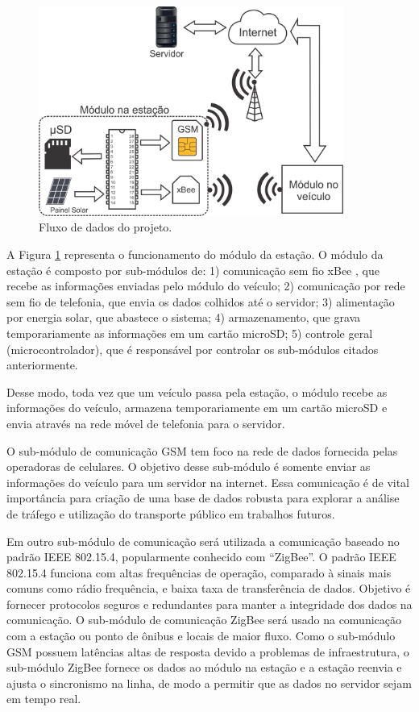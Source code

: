 \documentclass[12pt]{uftpibicsic2020}
\begin{document}
\begin{figure}[!h]
\centering
\includegraphics[width=10cm]{ruti2.png}
\caption{Fluxo de dados do projeto.}
\label{fig:modulo_estacao}
\end{figure}

A Figura \ref{fig:modulo_estacao} representa o funcionamento do módulo da estação. O módulo da estação é composto por sub-módulos de: 1) comunicação sem fio xBee \cite{xbee}, que recebe as informações enviadas pelo módulo do veículo; 2) comunicação por rede sem fio de telefonia, que envia os dados colhidos até o servidor; 3) alimentação por energia solar, que abastece o sistema; 4) armazenamento, que grava temporariamente as informações em um cartão microSD; 5) controle geral (microcontrolador), que é responsável por controlar os sub-módulos citados anteriormente.

Desse modo, toda vez que um veículo passa pela estação, o módulo recebe as informações do veículo, armazena temporariamente em um cartão microSD e envia através na rede móvel de telefonia para o servidor.

O sub-módulo de comunicação GSM tem foco na rede de dados fornecida pelas operadoras de celulares. O objetivo desse sub-módulo é somente enviar as informações do veículo para um servidor na internet. Essa comunicação é de vital importância para criação de uma base de dados robusta para explorar a análise de tráfego e utilização do transporte público em trabalhos futuros.

Em outro sub-módulo de comunicação será utilizada a comunicação baseado no padrão IEEE 802.15.4, popularmente conhecido com ``ZigBee''. O padrão IEEE 802.15.4 funciona com altas frequências de operação, comparado à sinais mais comuns como rádio frequência, e baixa taxa de transferência de dados. Objetivo é fornecer protocolos seguros e redundantes para manter a integridade dos dados na comunicação. O sub-módulo de comunicação ZigBee será usado na comunicação com a estação ou ponto de ônibus e locais de maior fluxo. Como o sub-módulo GSM possuem latências altas de resposta devido a problemas de infraestrutura, o sub-módulo ZigBee fornece os dados ao módulo na estação e a estação reenvia e ajusta o sincronismo na linha, de modo a permitir que as dados no servidor sejam em tempo real.
\end{document}
